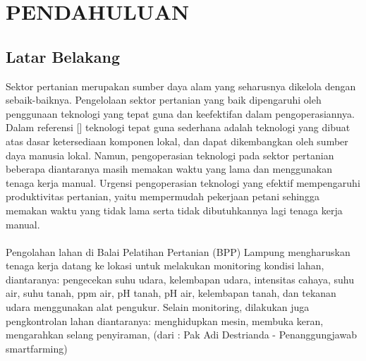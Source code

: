 \chapter{PENDAHULUAN}

\vspace{4.5pt}

\begin{flushleft}
    \section{Latar Belakang} 

\begin{justify}
  \noindent 
  Sektor pertanian merupakan sumber daya alam yang seharusnya dikelola dengan sebaik-baiknya. Pengelolaan sektor pertanian yang baik dipengaruhi oleh penggunaan teknologi yang tepat guna dan keefektifan dalam pengoperasiannya. Dalam referensi [] teknologi tepat guna sederhana adalah teknologi yang dibuat atas dasar ketersediaan komponen lokal, dan dapat dikembangkan oleh sumber daya manusia lokal. Namun, pengoperasian teknologi pada sektor pertanian beberapa diantaranya masih memakan waktu yang lama dan menggunakan tenaga kerja manual. Urgensi pengoperasian teknologi yang efektif mempengaruhi produktivitas pertanian, yaitu mempermudah pekerjaan petani sehingga memakan waktu yang tidak lama serta tidak dibutuhkannya lagi tenaga kerja manual. 
\\
\\
Pengolahan lahan di Balai Pelatihan Pertanian (BPP) Lampung mengharuskan tenaga kerja datang ke lokasi untuk melakukan monitoring kondisi lahan, diantaranya: pengecekan suhu udara, kelembapan udara, intensitas cahaya, suhu air, suhu tanah, ppm air, pH tanah, pH air, kelembapan tanah, dan tekanan udara menggunakan alat pengukur. Selain monitoring, dilakukan juga pengkontrolan lahan diantaranya: menghidupkan mesin, membuka keran, mengarahkan selang penyiraman, (dari : Pak Adi Destrianda - Penanggungjawab smartfarming)



\end{justify}
\end{flushleft}
